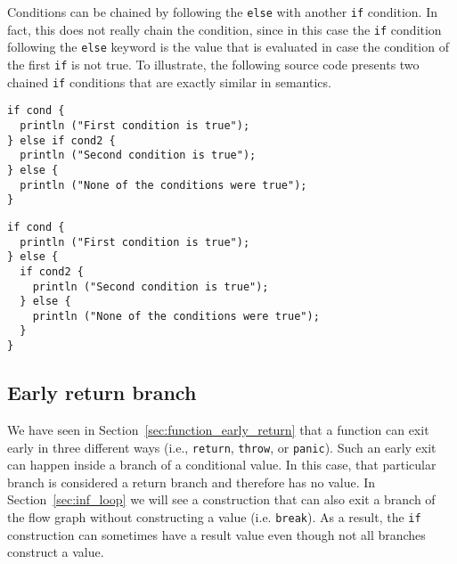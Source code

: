 Conditions can be chained by following the \texttt{else} with another
\texttt{if} condition. In fact, this does not really chain the condition, since
in this case the \texttt{if} condition following the \texttt{else} keyword is
the value that is evaluated in case the condition of the first \texttt{if} is
not true. To illustrate, the following source code presents two chained
\texttt{if} conditions that are exactly similar in semantics.


\begin{minipage}[t][][t]{0.47\linewidth}
\begin{lstlisting}[style=coloredverbatim, caption=Using a \texttt{if} as the value of the \texttt{else} branch]
if cond {
  println ("First condition is true");
} else if cond2 {
  println ("Second condition is true");
} else {
  println ("None of the conditions were true");
}
\end{lstlisting}
\end{minipage}\hspace{10pt}%
\begin{minipage}[t][][t]{0.47\linewidth}
  \begin{lstlisting}[style=coloredverbatim, caption=Using a block as the value of the \texttt{else} branch]
if cond {
  println ("First condition is true");
} else {
  if cond2 {
    println ("Second condition is true");
  } else {
    println ("None of the conditions were true");
  }
}
  \end{lstlisting}
\end{minipage}
\vspace{-10pt}%

\subsection{Early return branch}


We have seen in Section~\ref{sec:function_early_return} that a function can exit
early in three different ways (i.e., \texttt{return}, \texttt{throw}, or
\texttt{panic}). Such an early exit can happen inside a branch of a conditional
value. In this case, that particular branch is considered a return branch and
therefore has no value. In Section~\ref{sec:inf_loop} we will see a construction
that can also exit a branch of the flow graph without constructing a value (i.e.
\texttt{break}). As a result, the \texttt{if} construction can sometimes have a
result value even though not all branches construct a value.

\smallskip

